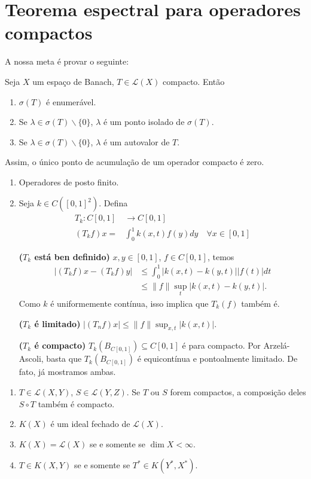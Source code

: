 \documentclass[portuguese]{article}
\theoremstyle{definition}
\begin{document}
\section{Teorema espectral para operadores compactos}
A nossa meta é provar o seguinte:

\begin{teo}
	Seja $X$ um espaço de Banach, $T\in\mathcal{L}(X)$ compacto. Então
	\begin{enumerate}
		\item $\sigma(T)$ é enumerável.
		\item Se $\lambda\in\sigma(T)\backslash\{0\}$, $\lambda$ é um ponto isolado de $\sigma(T)$.
		\item Se $\lambda\in\sigma(T)\backslash\{0\}$, $\lambda$ é um autovalor de $T$.
	\end{enumerate}
\end{teo}
Assim, o único ponto de acumulação de um operador compacto é zero.

\begin{exemplos}\leavevmode
	\begin{enumerate}
		\item Operadores de posto finito.
		\item Seja $k\in C([0,1]^2)$. Defina
		\begin{align*}
			T_k:C[0,1]&\to C[0,1]\\
			(T_kf)x=&\int_0^1k(x,t)f(y)dy\quad\forall x\in[0,1]
		\end{align*}
		
		\textbf{($T_k$ está ben definido)} $x,y\in[0,1]$, $f\in C[0,1]$, temos
		\begin{align*}
			|(T_kf)x-(T_kf)y|&\leq\int_0^1|k(x,t)-k(y,t)||f(t)|dt\\
			&\leq\|f\|\sup_t|k(x,t)-k(y,t)|.
		\end{align*}
		Como $k$ é uniformemente contínua, isso implica que $T_k(f)$ também é.
		
		\textbf{($T_k$ é limitado)} $|(T_nf)x|\leq\|f\|\sup_{x,t}|k(x,t)|$.
		
		\textbf{($T_k$ é compacto)} $T_k(B_{C[0,1]})\subseteq C[0,1]$ é para compacto. Por Arzelá-Ascoli, basta que $T_k(B_{C[0,1]})$ é equicontínua e pontoalmente limitado. De fato, já mostramos ambas.
	\end{enumerate}
\end{exemplos}
\begin{exer*}\leavevmode
	\begin{enumerate}
		\item $T\in\mathcal{L}(X,Y)$, $S\in\mathcal{L}(Y,Z)$. Se $T$ ou $S$ forem compactos, a composição deles $S\circ T$ também é compacto.
		\item $K(X)$ é um ideal fechado de $\mathcal{L}(X)$.
		\item $K(X)=\mathcal{L}(X)$ se e somente se $\dim X<\infty$.
		\item $T\in K(X,Y)$ se e somente se $T^*\in K(Y^*,X^*)$.
	\end{enumerate}
\end{exer*}
\end{document}
